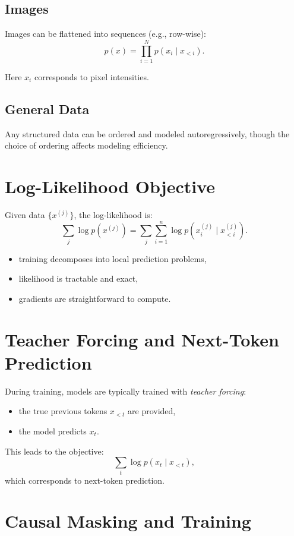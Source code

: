 \subsection{Images}

Images can be flattened into sequences (e.g., row-wise):
\[
p(x) = \prod_{i=1}^N p(x_i \mid x_{<i}).
\]

Here $x_i$ corresponds to pixel intensities.

\subsection{General Data}

Any structured data can be ordered and modeled autoregressively, though the choice of ordering affects modeling efficiency.

\section{Log-Likelihood Objective}

Given data $\{x^{(j)}\}$, the log-likelihood is:
\[
\sum_j \log p(x^{(j)}) = \sum_j \sum_{i=1}^n \log p(x_i^{(j)} \mid x_{<i}^{(j)}).
\]

\begin{itemize}
    \item training decomposes into local prediction problems,
    \item likelihood is tractable and exact,
    \item gradients are straightforward to compute.
\end{itemize}

\section{Teacher Forcing and Next-Token Prediction}

During training, models are typically trained with \emph{teacher forcing}:
\begin{itemize}
    \item the true previous tokens $x_{<t}$ are provided,
    \item the model predicts $x_t$.
\end{itemize}

This leads to the objective:
\[
\sum_t \log p(x_t \mid x_{<t}),
\]
which corresponds to next-token prediction.

\section{Causal Masking and Training}

